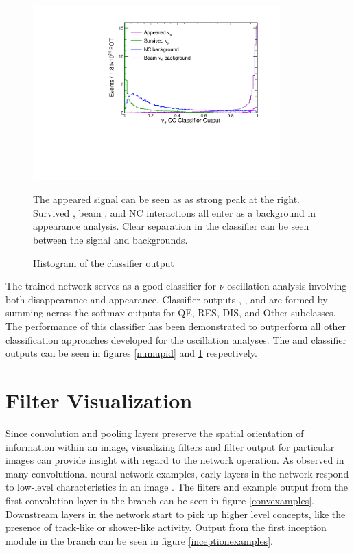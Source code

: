 \begin{figure}[t]
\begin{center}
\includegraphics[width=0.85\textwidth]{figures/cnn/nue_pid_dist.pdf}
\end{center}
\caption{Histogram of the \numu classifier output}{
The appeared \nue signal can be seen as as strong peak at the right.
Survived \numu, beam \nue, and NC interactions all enter as a background
in \nue appearance analysis.
Clear separation in the classifier can be seen between the signal and backgrounds.
}
\label{nuepid}
\end{figure}


The trained network serves as a good classifier for $\nu$ oscillation analysis
involving both \numu disappearance and \nue appearance.
Classifier outputs \nue, \numu, and \nutau are formed by summing across the
softmax outputs for QE, RES, DIS, and Other subclasses.
The performance of this classifier has been demonstrated to outperform
all other classification approaches developed for the \nova oscillation
analyses.
The \numu and \nue classifier outputs can be seen in figures \ref{numupid} and
\ref{nuepid} respectively.


\section{Filter Visualization}

Since convolution and pooling layers preserve the spatial orientation of
information within an image, visualizing filters and filter output for
particular images can provide insight with regard to the network operation.
As observed in many convolutional neural network examples,
early layers in the network respond to low-level characteristics
in an image \cite{lecun2015deep}.
The filters and example output from the first convolution layer in the \yview
branch can be seen in figure \ref{convexamples}.
Downstream layers in the network start to pick up higher level concepts,
like the presence of track-like or shower-like activity.
Output from the first inception module in the \yview branch can be seen
in figure \ref{inceptionexamples}.


